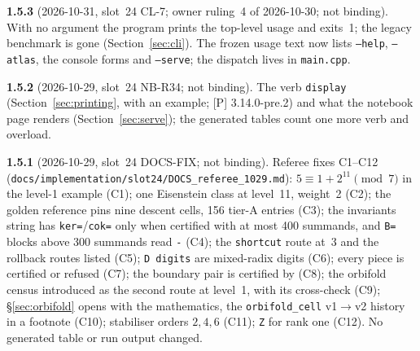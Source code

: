 \documentclass[11pt,openany]{report}
\newcommand{\cli}[1]{\texttt{#1}}
\newcommand{\file}[1]{\nolinkurl{#1}}
\newcommand{\vb}[1]{\texttt{#1}}
\begin{document}
\textbf{1.5.3} (2026-10-31, slot~24 CL-7; owner ruling~4 of 2026-10-30; not binding). With no argument the
program prints the top-level usage and exits~1; the legacy benchmark is gone (Section~\ref{sec:cli}). The frozen
usage text now lists \cli{--help}, \cli{--atlas}, the console forms and \cli{--serve}; the dispatch lives in
\file{main.cpp}.

\textbf{1.5.2} (2026-10-29, slot~24 NB-R34; not binding). The verb \vb{display} (Section~\ref{sec:printing}, with an
example; [P] 3.14.0-pre.2) and what the notebook page renders (Section~\ref{sec:serve}); the generated tables count
one more verb and overload.

\textbf{1.5.1} (2026-10-29, slot~24 DOCS-FIX; not binding). Referee fixes C1--C12
(\file{docs/implementation/slot24/DOCS\_referee\_1029.md}): $5\equiv1+2^{11}\pmod 7$ in the level-1 example (C1); one
Eisenstein class at level~11, weight~2 (C2); the golden reference pins nine descent cells, 156 tier-A entries (C3); the
invariants string has \texttt{ker=}/\texttt{cok=} only when certified with at most 400 summands, and \texttt{B=} blocks above 300
summands read \texttt{-} (C4); the \texttt{shortcut} route at~3 and the rollback routes listed (C5); \texttt{D digits} are
mixed-radix digits (C6); every piece is certified or refused (C7); the boundary pair is certified by
{} (C8); the orbifold census introduced as the second route at level~1, with its cross-check
(C9); \S\ref{sec:orbifold} opens with the mathematics, the \texttt{orbifold\_cell} v1$\to$v2 history in a footnote (C10);
stabiliser orders $2,4,6$ (C11); \texttt{Z} for rank one (C12). No generated table or run output changed.
\end{document}
